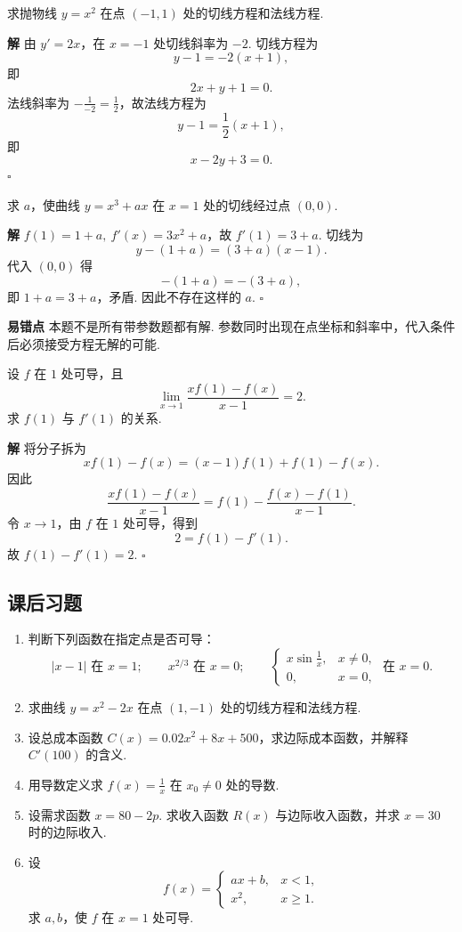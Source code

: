 \documentclass[fontset=fandol]{ctexart}
\newenvironment{solution}{\par\noindent\textbf{解}\quad}{\hfill$\square$\par\vspace{0.8em}}
\newenvironment{warning}{\par\noindent\textbf{易错点}\quad}{\par\vspace{0.8em}}
\begin{document}
\begin{example}[切线与法线]
求抛物线 $y=x^2$ 在点 $(-1,1)$ 处的切线方程和法线方程.
\end{example}
\begin{solution}
由 $y'=2x$，在 $x=-1$ 处切线斜率为 $-2$. 切线方程为
\[
y-1=-2(x+1),
\]
即
\[
2x+y+1=0.
\]
法线斜率为 $-\frac1{-2}=\frac12$，故法线方程为
\[
y-1=\frac12(x+1),
\]
即
\[
x-2y+3=0.
\]
\end{solution}

\begin{example}[切线与参数]
求 $a$，使曲线 $y=x^3+ax$ 在 $x=1$ 处的切线经过点 $(0,0)$.
\end{example}
\begin{solution}
$f(1)=1+a,\ f'(x)=3x^2+a$，故 $f'(1)=3+a$. 切线为
\[
y-(1+a)=(3+a)(x-1).
\]
代入 $(0,0)$ 得
\[
-(1+a)=-(3+a),
\]
即 $1+a=3+a$，矛盾. 因此不存在这样的 $a$.
\end{solution}
\begin{warning}
本题不是所有带参数题都有解. 参数同时出现在点坐标和斜率中，代入条件后必须接受方程无解的可能.
\end{warning}

\begin{example}[由切线条件反求函数值]
设 $f$ 在 $1$ 处可导，且
\[
\lim_{x\to1}\frac{xf(1)-f(x)}{x-1}=2.
\]
求 $f(1)$ 与 $f'(1)$ 的关系.
\end{example}
\begin{solution}
将分子拆为
\[
xf(1)-f(x)=(x-1)f(1)+f(1)-f(x).
\]
因此
\[
\frac{xf(1)-f(x)}{x-1}
=f(1)-\frac{f(x)-f(1)}{x-1}.
\]
令 $x\to1$，由 $f$ 在 $1$ 处可导，得到
\[
2=f(1)-f'(1).
\]
故 $f(1)-f'(1)=2$.
\end{solution}

\subsection{课后习题}
\begin{enumerate}[label=\textbf{练习\arabic*.},leftmargin=2.2em]
\item 判断下列函数在指定点是否可导：
\[
|x-1|\text{ 在 }x=1;\qquad
x^{2/3}\text{ 在 }x=0;\qquad
\begin{cases}x\sin\frac1x,&x\neq0,\\0,&x=0,\end{cases}\text{ 在 }x=0.
\]
\item 求曲线 $y=x^2-2x$ 在点 $(1,-1)$ 处的切线方程和法线方程.
\item 设总成本函数 $C(x)=0.02x^2+8x+500$，求边际成本函数，并解释 $C'(100)$ 的含义.
\item 用导数定义求 $f(x)=\frac1x$ 在 $x_0\neq0$ 处的导数.
\item 设需求函数 $x=80-2p$. 求收入函数 $R(x)$ 与边际收入函数，并求 $x=30$ 时的边际收入.
\item 设
\[
f(x)=
\begin{cases}
ax+b,&x<1,\\
x^2,&x\geq1.
\end{cases}
\]
求 $a,b$，使 $f$ 在 $x=1$ 处可导.
\end{enumerate}
\end{document}
